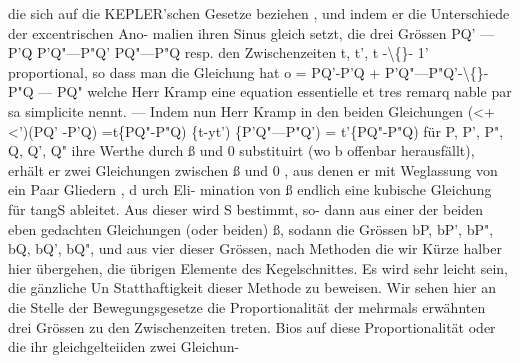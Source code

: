 \documentclass[12pt,a4paper]{article}
\begin{document}
die sich auf die KEPLER'schen Gesetze beziehen , und indem er die Unterschiede der excentrischen Ano-\newline
malien ihren Sinus gleich setzt, die drei Grössen\newline
PQ' ---P'Q\newline
P'Q"---P"Q'\newline
PQ"---P"Q\newline
resp. den Zwischenzeiten t, t', t -\textbackslash\{\}- 1' proportional, so dass man die Gleichung hat\newline
o = PQ'-P'Q + P'Q"---P"Q'-\textbackslash\{\}-P"Q --- PQ"\newline
welche Herr Kramp eine equation essentielle et tres remarq nable par sa simplicite nennt. --- Indem\newline
nun Herr Kramp in den beiden Gleichungen\newline
(<+<')(PQ' -P'Q) =t\{PQ"-P"Q)\newline
\{t-yt') \{P'Q"---P"Q') = t'\{PQ"-P"Q)\newline
für P, P', P", Q, Q', Q" ihre Werthe durch ß und 0 substituirt (wo b offenbar herausfällt), erhält er\newline
zwei Gleichungen zwischen ß und 0 , aus denen er mit Weglassung von ein Paar Gliedern , d urch Eli-\newline
mination von ß endlich eine kubische Gleichung für tangS ableitet. Aus dieser wird S bestimmt, so-\newline
dann aus einer der beiden eben gedachten Gleichungen (oder beiden) ß, sodann die Grössen bP, bP', bP",\newline
bQ, bQ', bQ", und aus vier dieser Grössen, nach Methoden die wir Kürze halber hier übergehen, die\newline
übrigen Elemente des Kegelschnittes.\newline
Es wird sehr leicht sein, die gänzliche Un Statthaftigkeit dieser Methode zu beweisen. Wir sehen\newline
hier an die Stelle der Bewegungsgesetze die Proportionalität der mehrmals erwähnten drei Grössen zu\newline
den Zwischenzeiten treten. Bios auf diese Proportionalität oder die ihr gleichgelteiiden zwei Gleichun-\newline
\end{document}
